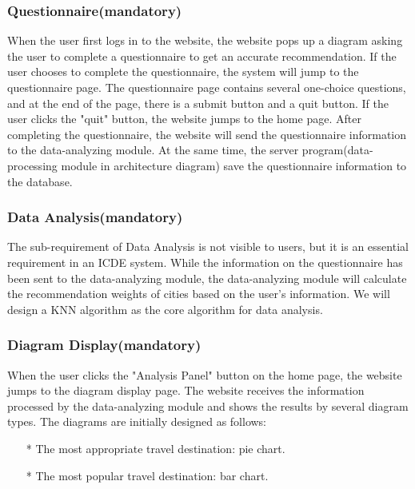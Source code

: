 \documentclass[conference]{IEEEtran}
\begin{document}
\subsubsection{ Questionnaire(mandatory) }

When the user first logs in to the website, the website pops up a diagram asking the user to complete a questionnaire to 
get an accurate recommendation. If the user chooses 
to complete the questionnaire, the system will jump to the questionnaire page. The questionnaire page contains several one-choice questions, and
at the end of the page, there is a submit button and a quit button. If the user clicks the "quit" button, the website jumps to the home page.
After completing the questionnaire, the website will send the 
questionnaire information to the data-analyzing module. At the same time, the server program(data-processing module in architecture diagram) 
save the questionnaire information to the database.

\subsubsection{ Data Analysis(mandatory) }

The sub-requirement of Data Analysis is not visible to users, but it is an essential requirement in an ICDE system. While the information on the questionnaire has been sent to
the data-analyzing module, the data-analyzing module will calculate the recommendation weights of cities based on the user's information. We will design a KNN algorithm as the core 
algorithm for data analysis.  


\subsubsection{ Diagram Display(mandatory) }

When the user clicks the "Analysis Panel" button on the home page, the website jumps to the diagram display page.
The website receives the information processed by the data-analyzing module and shows the results by several diagram types. 
The diagrams are initially designed as follows:

\begin{itemize}
\item[*] The most appropriate travel destination: pie chart.

\item[*] The most popular travel destination: bar chart.
\end{itemize}
\end{document}
